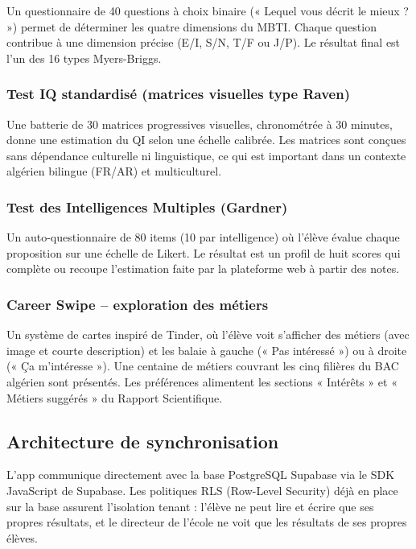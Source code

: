 \documentclass[12pt,a4paper,oneside]{report}
\begin{document}
Un questionnaire de 40 questions à choix binaire (« Lequel vous décrit le mieux ? ») permet de déterminer les quatre dimensions du MBTI. Chaque question contribue à une dimension précise (E/I, S/N, T/F ou J/P). Le résultat final est l'un des 16 types Myers-Briggs.

\subsubsection{Test IQ standardisé (matrices visuelles type Raven)}

Une batterie de 30 matrices progressives visuelles, chronométrée à 30 minutes, donne une estimation du QI selon une échelle calibrée. Les matrices sont conçues sans dépendance culturelle ni linguistique, ce qui est important dans un contexte algérien bilingue (FR/AR) et multiculturel.

\subsubsection{Test des Intelligences Multiples (Gardner)}

Un auto-questionnaire de 80 items (10 par intelligence) où l'élève évalue chaque proposition sur une échelle de Likert. Le résultat est un profil de huit scores qui complète ou recoupe l'estimation faite par la plateforme web à partir des notes.

\subsubsection{Career Swipe -- exploration des métiers}

Un système de cartes inspiré de Tinder, où l'élève voit s'afficher des métiers (avec image et courte description) et les balaie à gauche (« Pas intéressé ») ou à droite (« Ça m'intéresse »). Une centaine de métiers couvrant les cinq filières du BAC algérien sont présentés. Les préférences alimentent les sections « Intérêts » et « Métiers suggérés » du Rapport Scientifique.

\subsection{Architecture de synchronisation}

L'app communique directement avec la base PostgreSQL Supabase via le SDK JavaScript de Supabase. Les politiques RLS (Row-Level Security) déjà en place sur la base assurent l'isolation tenant : l'élève ne peut lire et écrire que ses propres résultats, et le directeur de l'école ne voit que les résultats de ses propres élèves.
\end{document}
